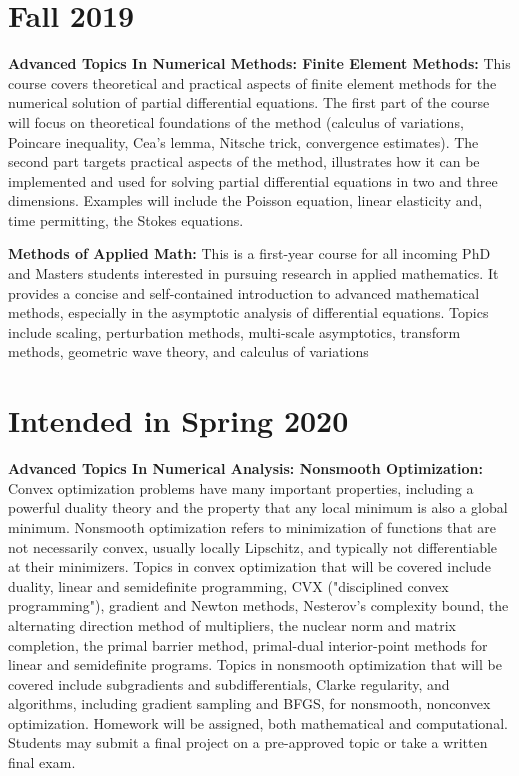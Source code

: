 \documentclass[11pt]{article}
\begin{document}
\section*{Fall 2019}

{\bf Advanced Topics In Numerical Methods: Finite Element Methods:} This course
covers theoretical and practical aspects of finite element methods for the
numerical solution of partial differential equations. The first part of the
course will focus on theoretical foundations of the method (calculus of
variations, Poincare inequality, Cea's lemma, Nitsche trick, convergence
estimates). The second part targets practical aspects of the method, illustrates
how it can be implemented and used for solving partial differential equations in
two and three dimensions. Examples will include the Poisson equation, linear
elasticity and, time permitting, the Stokes equations.

{\bf Methods of Applied Math:} This is a first-year course for all incoming PhD
and Masters students interested in pursuing research in applied mathematics. It
provides a concise and self-contained introduction to advanced mathematical
methods, especially in the asymptotic analysis of differential equations. Topics
include scaling, perturbation methods, multi-scale asymptotics, transform
methods, geometric wave theory, and calculus of variations

\section*{Intended in Spring 2020}

{\bf Advanced Topics In Numerical Analysis: Nonsmooth Optimization:} Convex
optimization problems have many important properties, including a powerful
duality theory and the property that any local minimum is also a global minimum.
Nonsmooth optimization refers to minimization of functions that are not
necessarily convex, usually locally Lipschitz, and typically not differentiable
at their minimizers. Topics in convex optimization that will be covered include
duality, linear and semidefinite programming, CVX ("disciplined convex
programming"), gradient and Newton methods, Nesterov's complexity bound, the
alternating direction method of multipliers, the nuclear norm and matrix
completion, the primal barrier method, primal-dual interior-point methods for
linear and semidefinite programs. Topics in nonsmooth optimization that will be
covered include subgradients and subdifferentials, Clarke regularity, and
algorithms, including gradient sampling and BFGS, for nonsmooth, nonconvex
optimization. Homework will be assigned, both mathematical and computational.
Students may submit a final project on a pre-approved topic or take a written
final exam.
\end{document}
